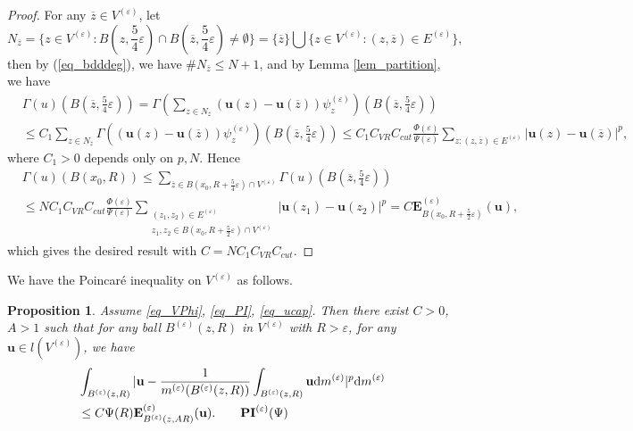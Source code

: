 \documentclass[11pt,a4paper]{article}
\numberwithin{equation}{section}
\theoremstyle{plain}
\newtheorem{proposition}[theorem]{Proposition}
\theoremstyle{definition}
\begin{document}
\begin{proof}
For any $\overline{z}\in V^{(\varepsilon)}$, let
$$N_{\overline{z}}=\{z\in V^{(\varepsilon)}:B(z,\frac{5}{4}\varepsilon)\cap B(\overline{z},\frac{5}{4}\varepsilon)\ne\emptyset\}=\{\overline{z}\}\bigcup\{z\in V^{(\varepsilon)}:(z,\overline{z})\in E^{(\varepsilon)}\},$$
then by (\ref{eq_bdddeg}), we have $\# N_{\overline{z}}\le N+1$, and by Lemma \ref{lem_partition}, we have
\begin{align*}
&\Gamma(u)\left(B(\overline{z},\frac{5}{4}\varepsilon)\right)=\Gamma \left(\sum_{z\in N_{\overline{z}}}\left(\mathbf{u}(z)-\mathbf{u}(\overline{z})\right)\psi_z^{(\varepsilon)}\right)\left(B(\overline{z},\frac{5}{4}\varepsilon)\right)\\
&\le C_1\sum_{z\in N_{\overline{z}}}\Gamma \left(\left(\mathbf{u}(z)-\mathbf{u}(\overline{z})\right)\psi_z^{(\varepsilon)}\right)\left(B(\overline{z},\frac{5}{4}\varepsilon)\right)\le C_1C_{VR}C_{cut}\frac{\Phi(\varepsilon)}{\Psi(\varepsilon)}\sum_{{z:(z,\overline{z})\in E^{(\varepsilon)}}}|\mathbf{u}(z)-\mathbf{u}(\overline{z})|^p,
\end{align*}
where $C_1>0$ depends only on $p, N$. Hence
\begin{align*}
&\Gamma(u)(B(x_0,R))\le\sum_{{\overline{z}\in B(x_0,R+\frac{5}{4}\varepsilon)\cap V^{(\varepsilon)}}}\Gamma(u)(B(\overline{z},\frac{5}{4}\varepsilon))\\
&\le NC_1C_{VR}C_{cut}\frac{\Phi(\varepsilon)}{\Psi(\varepsilon)}\sum_{\substack{(z_1,z_2)\in E^{(\varepsilon)}\\z_1,z_2\in B(x_0,R+\frac{5}{2}\varepsilon)\cap V^{(\varepsilon)}}}|\mathbf{u}(z_1)-\mathbf{u}(z_2)|^p=C\mathbf{E}^{(\varepsilon)}_{B(x_0,R+\frac{5}{2}\varepsilon)}(\mathbf{u}),
\end{align*}
which gives the desired result with $C=NC_1C_{VR}C_{cut}$.
\end{proof}

We have the Poincar\'e inequality on $V^{(\varepsilon)}$ as follows.

\begin{proposition}\label{prop_PI_Veps}
Assume \ref{eq_VPhi}, \ref{eq_PI}, \ref{eq_ucap}. Then there exist $C>0$, $A>1$ such that for any ball $B^{(\varepsilon)}(z,R)$ in $V^{(\varepsilon)}$ with $R>\varepsilon$, for any $\mathbf{u}\in l(V^{(\varepsilon)})$, we have
\begin{align*}
&\int_{B^{(\varepsilon)}(z,R)}|\mathbf{u}-\frac{1}{m^{(\varepsilon)}(B^{(\varepsilon)}(z,R))}\int_{B^{(\varepsilon)}(z,R)}\mathbf{u}\mathrm{d} m^{(\varepsilon)}|^p\mathrm{d} m^{(\varepsilon)}\\
&\le C\Psi(R)\mathbf{E}^{(\varepsilon)}_{B^{(\varepsilon)}(z,AR)}(\mathbf{u}).\label{eq_PI_Veps}\tag*{$\mathbf{PI}^{(\varepsilon)}(\Psi)$}
\end{align*}

\end{proposition}
\end{document}
